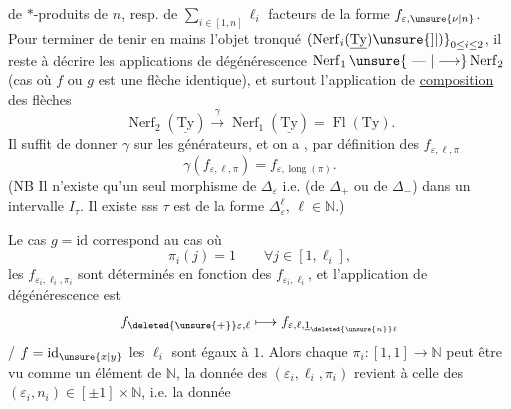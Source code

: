 

de $*$-produits de $n$, resp. de $\sum_{i\in[1,n]}\ell_i$ facteurs de la forme $f_{\varepsilon,\unsure{\nu|n}}$. Pour terminer de tenir en mains l'objet  tronqué $(\operatorname{Nerf}_i(\underline{\mathrm{Ty}})\unsure{]|)}_{0\leq i\leq2}$, il reste à décrire les  applications de dégénérescence $\operatorname{Nerf}_1\unsure{\text{ --- }|\longrightarrow}\operatorname{Nerf}_2$ (cas où $f$ ou $g$ est une flèche identique), et surtout l'application de \uline{composition} des flèches
\[
\operatorname{Nerf}_2(\underline{\mathrm{Ty}})\xrightarrow{\gamma}\operatorname{Nerf}_1(\underline{\mathrm{Ty}})=\operatorname{Fl}(\mathrm{Ty}).
\]
Il suffit de donner $\gamma$ sur les générateurs, et on a , par définition des $f_{\varepsilon,\ell,\pi}$
\[
\gamma(f_{\varepsilon,\ell,\pi})=f_{\varepsilon,\operatorname{long}(\pi)}.
\]
(NB Il n'existe  qu'un seul morphisme de $\Delta_\varepsilon$ i.e. (de $\Delta_+$ ou de $\Delta_-$) dans un intervalle $I_\tau$. Il existe sss $\tau$ est de la forme $\Delta_\varepsilon^\ell$, $\ell\in\mathbb N$.)

Le cas $g=\mathrm{id}$ correspond au cas où
\[
\pi_i(j)=1\qquad\forall j\in[1,\ell_i],
\]
les $f_{\varepsilon_i,\ell_i,\pi_i}$ sont  déterminés en fonction des $f_{\varepsilon_i,\ell_i}$, et l'application de dégénérescence est
\[
 f_{\deleted{\unsure{+}}\varepsilon,\ell}\longmapsto f_{\varepsilon,\ell,\underline{1}_{\deleted{\unsure{n}}\ell}}
\]
  / $f=\mathrm{id}_{\unsure{x|y}}$  les $\ell_i$ sont égaux à $1$. Alors   chaque $\pi_i:[1,1]\to\mathbb N$ peut être vu comme un  élément de $\mathbb N$, la donnée des $(\varepsilon_i,\ell_i,\pi_i)$ revient à celle des $(\varepsilon_i,n_i)\in[\pm1]\times\mathbb N$, i.e. la donnée 
